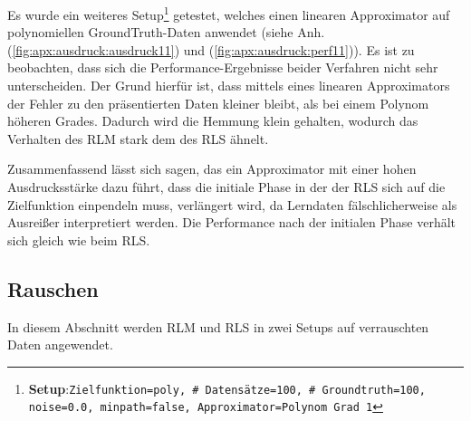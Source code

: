 \documentclass[a4paper, 12pt]{article}
\begin{document}
{Es wurde ein weiteres Setup\footnote{\textbf{Setup}:\quad\texttt{Zielfunktion=poly, \# Datensätze=100, \# Groundtruth=100, noise=0.0, minpath=false, Approximator=Polynom Grad 1}} getestet, welches einen linearen Approximator auf polynomiellen GroundTruth-Daten anwendet (siehe Anh. (\ref{fig:apx:ausdruck:ausdruck11}) und (\ref{fig:apx:ausdruck:perf11})). Es ist zu beobachten, dass sich die Performance-Ergebnisse beider Verfahren nicht sehr unterscheiden. Der Grund hierfür ist, dass mittels eines linearen Approximators der Fehler zu den präsentierten Daten kleiner bleibt, als bei einem Polynom höheren Grades. Dadurch wird die Hemmung klein gehalten, wodurch das Verhalten des RLM stark dem des RLS ähnelt.

Zusammenfassend lässt sich sagen, das ein Approximator mit einer hohen Ausdrucksstärke dazu führt, dass die initiale Phase in der der RLS sich auf die Zielfunktion einpendeln muss, verlängert wird, da Lerndaten fälschlicherweise als Ausreißer interpretiert werden. Die Performance nach der initialen Phase verhält sich gleich wie beim RLS.

\subsection{Rauschen}
\label{sec:perf:rauschen}
In diesem Abschnitt werden RLM und RLS in zwei Setups auf verrauschten Daten angewendet.

}
\end{document}
